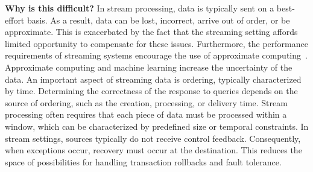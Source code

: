 
\textbf{Why is this difficult?}
%
In stream processing, data is typically sent on a best-effort basis.
As a result, data can be lost, incorrect, arrive out of order, or be
approximate. This is exacerbated by the fact that the streaming
setting affords limited opportunity to compensate for these issues.
Furthermore, the performance requirements of streaming systems
encourage the use of approximate computing~\cite{babcock_et_al_2002}.
Approximate computing and machine learning increase the uncertainty of
the data. An important aspect of streaming data is ordering, typically
characterized by time.  Determining the correctness of the response to
queries depends on the source of ordering, such as the creation,
processing, or delivery time.  Stream processing often requires that
each piece of data must be processed within a window, which can be
characterized by predefined size or temporal constraints. In stream
settings, sources typically do not receive control feedback.
Consequently, when exceptions occur, recovery must occur at the
destination. This reduces the space of possibilities for handling
transaction rollbacks and fault tolerance.


